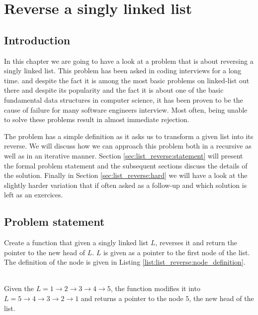 %

\chapter{Reverse a singly linked list}
\label{ch:list_reverse}

\section*{Introduction}
In this chapter we are going to have a look at a problem that is about reversing a singly linked list.
This problem has been asked in coding interviews for a long
time. and despite the fact it is among the most basic problems on linked-list out there and despite its popularity
and the fact it is about one of the basic fundamental data structures in computer science, it has
been proven to be the cause of failure for many software engineers interview. Most often, being unable to solve these
problems result in almost immediate rejection.

The problem has  a simple definition as it asks us to transform a given list into its reverse.
We will discuss how we can approach this problem both in a recursive as well as in an iterative
manner. Section \ref{sec:list_reverse:statement} will present the formal problem statement and the subsequent sections 
discuss the details of the solution. Finally in Section \ref{sec:list_reverse:hard} we will have a look at the slightly harder variation that if
often asked as a follow-up and which solution is left as an exercices.


\section{Problem statement}
\begin{exercise}
Create a function that given a singly linked list $L$, reverses it and return the pointer to the new
head of $L$. $L$ is given as a pointer to the first node of the list. The definition of the node is
given in Listing \ref{list:list_reverse:node_definition}.



\begin{example}
	\hfill \\
	Given the $L = 1 \rightarrow 2 \rightarrow 3 \rightarrow 4 \rightarrow 5$, the function modifies
	it into $L = 5 \rightarrow 4 \rightarrow 3 \rightarrow 2 \rightarrow 1$ and returns a pointer to
	the node $5$, the new head of the list.
\end{example}

\end{exercise}

